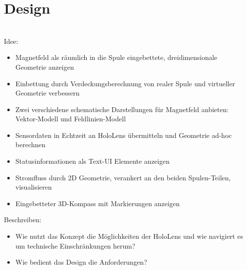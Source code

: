 \section{Design}
\label{sec-4}
\\

Idee:
\begin{itemize}
	\item Magnetfeld als räumlich in die Spule eingebettete, dreidimensionale Geometrie anzeigen
	\item Einbettung durch Verdeckungsberechnung von realer Spule und virtueller Geometrie verbessern
	\item Zwei verschiedene schematische Darstellungen für Magnetfeld anbieten: Vektor-Modell und Feldlinien-Modell
	\item Sensordaten in Echtzeit an HoloLens übermitteln und Geometrie ad-hoc berechnen
	\item Statusinformationen als Text-UI Elemente anzeigen
	\item Stromfluss durch 2D Geometrie, verankert an den beiden Spulen-Teilen, visualisieren
	\item Eingebetteter 3D-Kompass mit Markierungen anzeigen
\end{itemize}

Beschreiben: 
\begin{itemize}
	\item Wie nutzt das Konzept die Möglichkeiten der HoloLens und wie navigiert es um technische Einschränkungen herum?
	\item Wie bedient das Design die Anforderungen?
\end{itemize}

